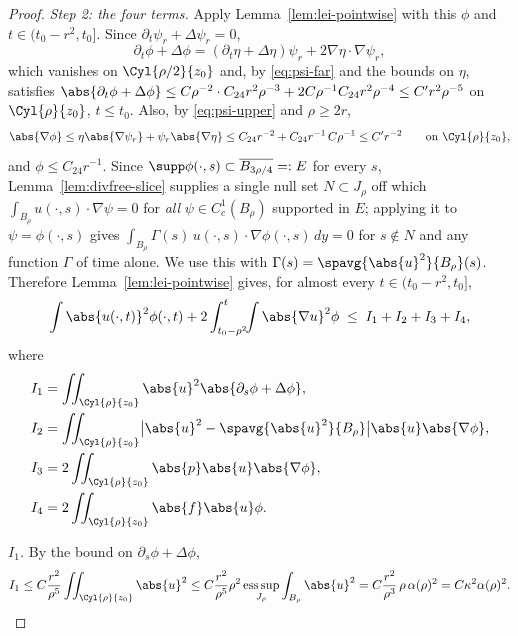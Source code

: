 \documentclass[11pt,reqno]{amsart}
\begin{document}
\begin{proof}
\emph{Step 2: the four terms.} Apply Lemma~\ref{lem:lei-pointwise} with this
$\phi$ and $t\in(t_{0}-r^{2},t_{0}]$. Since
$\partial_{t}\psi_{r}+\Delta\psi_{r}=0$,
\begin{equation}\label{eq:phi-heat}
  \partial_{t}\phi+\Delta\phi
  =(\partial_{t}\eta+\Delta\eta)\psi_{r}+2\nabla\eta\cdot\nabla\psi_{r},
\end{equation}
which vanishes on $\Cyl{\rho/2}{z_{0}}$ and, by \eqref{eq:psi-far} and the
bounds on $\eta$, satisfies
$\abs{\partial_{t}\phi+\Delta\phi}\le C\rho^{-2}\cdot C_{24}r^{2}\rho^{-3}
 +2C\rho^{-1}C_{24}r^{2}\rho^{-4}\le C'r^{2}\rho^{-5}$ on
$\Cyl{\rho}{z_{0}}$, $t\le t_{0}$. Also, by \eqref{eq:psi-upper} and
$\rho\ge2r$,
\begin{equation}\label{eq:grad-phi}
  \abs{\nabla\phi}\le\eta\abs{\nabla\psi_{r}}+\psi_{r}\abs{\nabla\eta}
  \le C_{24}r^{-2}+C_{24}r^{-1}\,C\rho^{-1}\le C'r^{-2}
  \qquad\text{on }\Cyl{\rho}{z_{0}} ,
\end{equation}
and $\phi\le C_{24}r^{-1}$. Since $\supp\phi(\cdot,s)\subset\overline{B_{3\rho/4}}=:E$ for every $s$,
Lemma~\ref{lem:divfree-slice} supplies a single null set $N\subset J_{\rho}$ off
which $\int_{B_{\rho}}u(\cdot,s)\cdot\nabla\psi=0$ for \emph{all}
$\psi\in C^{1}_{c}(B_{\rho})$ supported in $E$; applying it to
$\psi=\phi(\cdot,s)$ gives
$\int_{B_{\rho}}\Gamma(s)\,u(\cdot,s)\cdot\nabla\phi(\cdot,s)\,dy=0$ for
$s\notin N$ and any function $\Gamma$ of time alone. We use this with
$\Gamma(s)=\spavg{\abs{u}^{2}}{B_{\rho}}(s)$. Therefore
Lemma~\ref{lem:lei-pointwise} gives, for almost every $t\in(t_{0}-r^{2},t_{0}]$,
\[
  \int\abs{u(\cdot,t)}^{2}\phi(\cdot,t)
  +2\int_{t_{0}-\rho^{2}}^{t}\!\!\int\abs{\nabla u}^{2}\phi
  \;\le\;I_{1}+I_{2}+I_{3}+I_{4},
\]
where
\[\begin{aligned}
  &I_{1}=\iint_{\Cyl{\rho}{z_{0}}}\abs{u}^{2}\abs{\partial_{s}\phi+\Delta\phi},
  \\
  &I_{2}=\iint_{\Cyl{\rho}{z_{0}}}
     \bigl|\abs{u}^{2}-\spavg{\abs{u}^{2}}{B_{\rho}}\bigr|\abs{u}\abs{\nabla\phi},
  \\
  &I_{3}=2\iint_{\Cyl{\rho}{z_{0}}}\abs{p}\abs{u}\abs{\nabla\phi},
  \\
  &I_{4}=2\iint_{\Cyl{\rho}{z_{0}}}\abs{f}\abs{u}\phi .
\end{aligned}\]

\emph{$I_{1}$.} By the bound on $\partial_{s}\phi+\Delta\phi$,
\[
  I_{1}\le C\frac{r^{2}}{\rho^{5}}\iint_{\Cyl{\rho}{z_{0}}}\abs{u}^{2}
  \le C\frac{r^{2}}{\rho^{5}}\rho^{2}\operatorname*{ess\,sup}_{J_{\rho}}\int_{B_{\rho}}\abs{u}^{2}
  = C\frac{r^{2}}{\rho^{3}}\,\rho\,\alpha(\rho)^{2}
  = C\kappa^{2}\alpha(\rho)^{2}.
\]


\end{proof}
\end{document}

